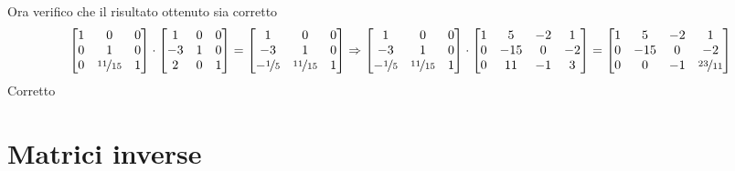 \documentclass[italian]{article}
\begin{document}
Ora verifico che il risultato ottenuto sia corretto
\[
	\begin{bmatrix}
		1 & 0 & 0 \\
		0 & 1 & 0 \\
		0 & \nicefrac{11}{15} & 1
	\end{bmatrix}
	\cdot
	\begin{bmatrix}
		1 & 0 & 0 \\
		-3 & 1 & 0 \\
		2 & 0 & 1
	\end{bmatrix}
	=
	\begin{bmatrix}
		1 & 0 & 0 \\
		-3 & 1 & 0 \\
		-\nicefrac{1}{5} & \nicefrac{11}{15} & 1
	\end{bmatrix}
	\Rightarrow
	\begin{bmatrix}
		1 & 0 & 0 \\
		-3 & 1 & 0 \\
		-\nicefrac{1}{5} & \nicefrac{11}{15} & 1
	\end{bmatrix}
	\cdot
	\begin{bmatrix}
		1 & 5 & -2 & 1\\
		0 & -15 & 0 & -2\\
		0 & 11 & -1 & 3 
	\end{bmatrix}
	=
	\begin{bmatrix}
		1 & 5 & -2 & 1 \\
		0 & -15 & 0 & -2 \\
		0 & 0 & -1 & \nicefrac{23}{11}
	\end{bmatrix}
\]
Corretto

\pagebreak
\section{Matrici inverse}
\end{document}
